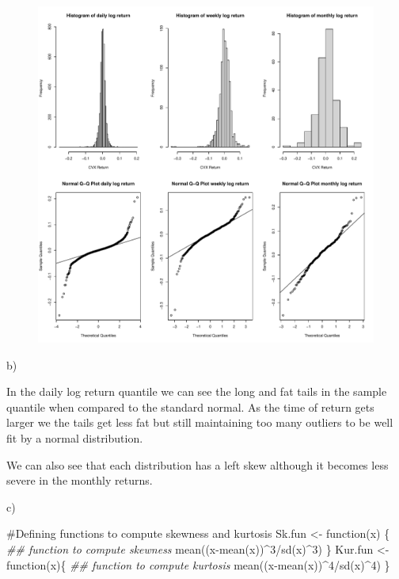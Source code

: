 \documentclass[
  letterpaper,
  DIV=11,
  numbers=noendperiod]{scrartcl}
\newenvironment{Shaded}{\begin{snugshade}}{\end{snugshade}}
\newcommand{\CommentTok}[1]{\textcolor[rgb]{0.37,0.37,0.37}{#1}}
\newcommand{\ControlFlowTok}[1]{\textcolor[rgb]{0.00,0.23,0.31}{#1}}
\newcommand{\DecValTok}[1]{\textcolor[rgb]{0.68,0.00,0.00}{#1}}
\newcommand{\DocumentationTok}[1]{\textcolor[rgb]{0.37,0.37,0.37}{\textit{#1}}}
\newcommand{\FunctionTok}[1]{\textcolor[rgb]{0.28,0.35,0.67}{#1}}
\newcommand{\NormalTok}[1]{\textcolor[rgb]{0.00,0.23,0.31}{#1}}
\newcommand{\OtherTok}[1]{\textcolor[rgb]{0.00,0.23,0.31}{#1}}
\newcommand{\SpecialCharTok}[1]{\textcolor[rgb]{0.37,0.37,0.37}{#1}}
\begin{document}
\begin{figure}[H]

{\centering \includegraphics{homework_1_files/figure-pdf/unnamed-chunk-15-1.pdf}

}

\end{figure}

b)

In the daily log return quantile we can see the long and fat tails in
the sample quantile when compared to the standard normal. As the time of
return gets larger we the tails get less fat but still maintaining too
many outliers to be well fit by a normal distribution.

We can also see that each distribution has a left skew although it
becomes less severe in the monthly returns.

c)

\begin{Shaded}
\begin{Highlighting}[]
\CommentTok{\#Defining functions to compute skewness and kurtosis}
\NormalTok{Sk.fun }\OtherTok{\textless{}{-}} \ControlFlowTok{function}\NormalTok{(x) \{ }\DocumentationTok{\#\# function to compute skewness}
\FunctionTok{mean}\NormalTok{((x}\SpecialCharTok{{-}}\FunctionTok{mean}\NormalTok{(x))}\SpecialCharTok{\^{}}\DecValTok{3}\SpecialCharTok{/}\FunctionTok{sd}\NormalTok{(x)}\SpecialCharTok{\^{}}\DecValTok{3}\NormalTok{)}
\NormalTok{\}}
\NormalTok{Kur.fun }\OtherTok{\textless{}{-}} \ControlFlowTok{function}\NormalTok{(x)\{ }\DocumentationTok{\#\# function to compute kurtosis}
\FunctionTok{mean}\NormalTok{((x}\SpecialCharTok{{-}}\FunctionTok{mean}\NormalTok{(x))}\SpecialCharTok{\^{}}\DecValTok{4}\SpecialCharTok{/}\FunctionTok{sd}\NormalTok{(x)}\SpecialCharTok{\^{}}\DecValTok{4}\NormalTok{)}
\NormalTok{\}}
\end{Highlighting}
\end{Shaded}
\end{document}
